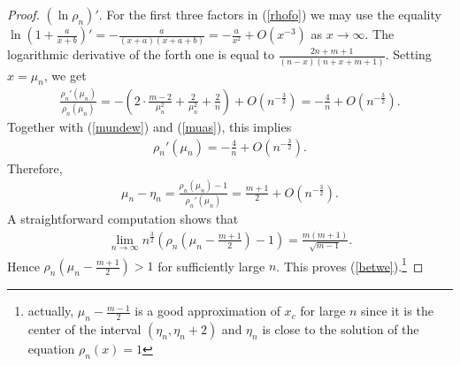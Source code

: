 \documentclass[10pt]{amsart}
\theoremstyle{remark}
\begin{document}
\begin{proof}
$(\ln\rho_n)'$. For the first three factors in (\ref{rhofo}) we
may use the equality
$\ln\left(1+\frac{a}{x+b}\right)'=-\frac{a}{(x+a)(x+a+b)}
=-\frac{a}{x^2}+O\left(x^{-3}\right)$ as $x\to\infty$. The
logarithmic derivative of the forth one is equal to
$\frac{2n+m+1}{(n-x)(n+x+m+1)}$. Setting $x=\mu_n$, we get
\begin{eqnarray*}
\frac{\rho_n'(\mu_n)}{\rho_n(\mu_n)}=-\left(2\cdot\frac{m-2}{\mu_n^2}
+\frac{2}{\mu_n^2}+\frac{2}{n}\right)+O\left(n^{-\frac32}\right)
=-\frac{4}{n}+O\left(n^{-\frac32}\right).
\end{eqnarray*}
Together with (\ref{mundew}) and (\ref{muas}), this implies
\begin{eqnarray}\label{rhopmn}
\rho_n'(\mu_n)=-\frac4n+O\left(n^{-\frac32}\right).
\end{eqnarray}
Therefore,
\begin{eqnarray*}
\mu_n-\eta_n=\frac{\rho_n(\mu_n)-1}{\rho_n'(\mu_n)}=\frac{m+1}{2}
+O\left(n^{-\frac32}\right).
\end{eqnarray*}
A straightforward computation shows that
\begin{eqnarray*}
\lim_{n\to\infty}
n^{\frac32}\left(\rho_n\left(\mu_n-\frac{m+1}{2}\right)-1\right)
=\frac{m(m+1)}{\sqrt{m-1}}.
\end{eqnarray*}
Hence $\rho_n\left(\mu_n-\frac{m+1}{2}\right)>1$ for sufficiently
large $n$. This proves (\ref{betwe}).\footnote{actually,
$\mu_n-\frac{m-1}{2}$ is a good approximation of $x_c$ for large
$n$ since it is the center of the interval $(\eta_n,\eta_n+2)$ and
$\eta_n$ is close to the solution of the equation $\rho_n(x)=1$}

\smallskip


\end{proof}
\end{document}
